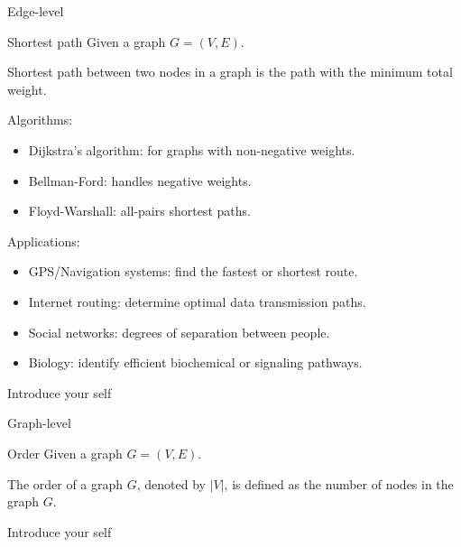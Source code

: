 \documentclass{beamer}
\begin{document}
    \begin{frame}{Edge-level}
        \begin{exampleblock}{Shortest path}
            Given a graph $G = (V, E)$.
            
            Shortest path between two nodes in a graph is the path with the minimum total weight.
                        
        \end{exampleblock}
        \vspace{-2mm}

        Algorithms:
        \begin{itemize}
            \item Dijkstra's algorithm: for graphs with non-negative weights.
            \item Bellman-Ford: handles negative weights.
            \item Floyd-Warshall: all-pairs shortest paths.
        \end{itemize}

        Applications:
        \begin{itemize}
            \item GPS/Navigation systems: find the fastest or shortest route.
            \item Internet routing: determine optimal data transmission paths.
            \item Social networks: degrees of separation between people.
            \item Biology: identify efficient biochemical or signaling pathways.
        \end{itemize}


        \begin{note}
            {Introduce your self}
        \end{note}
    \end{frame}

    \begin{frame}{Graph-level}
        \begin{exampleblock}{Order}
            Given a graph $G = (V, E)$.
            
            The order of a graph $G$, denoted by $|V|$, is defined as the number of nodes in the graph $G$.
            
        \end{exampleblock}

        \begin{note}
            {Introduce your self}
        \end{note}
    \end{frame}
\end{document}
